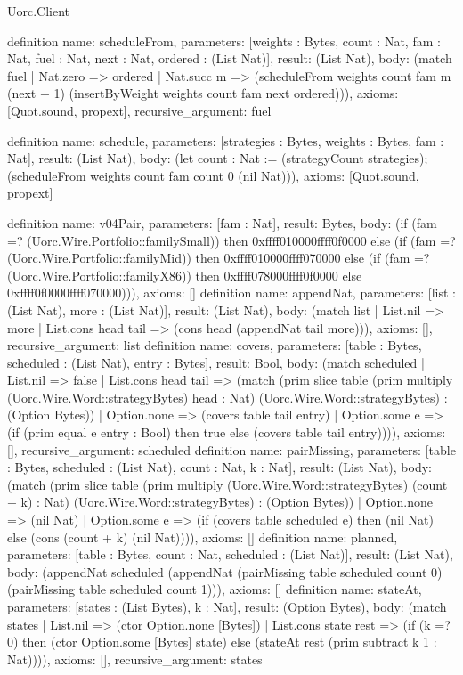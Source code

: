\begin{lexlean}{Uorc.Client}
\begin{semanticmodule}
definition{
  name: scheduleFrom,
  parameters: [weights : Bytes, count : Nat, fam : Nat, fuel : Nat, next : Nat, ordered : (List Nat)],
  result: (List Nat),
  body: (match fuel
    | Nat.zero => ordered
    | Nat.succ m => (scheduleFrom weights count fam m (next + 1) (insertByWeight weights count fam next ordered))),
  axioms: [Quot.sound, propext],
  recursive_argument: fuel
}

definition{
  name: schedule,
  parameters: [strategies : Bytes, weights : Bytes, fam : Nat],
  result: (List Nat),
  body: (let count : Nat := (strategyCount strategies); (scheduleFrom weights count fam count 0 (nil Nat))),
  axioms: [Quot.sound, propext]
}

definition{
  name: v04Pair,
  parameters: [fam : Nat],
  result: Bytes,
  body: (if (fam =? (Uorc.Wire.Portfolio::familySmall)) then 0xffff010000ffff0f0000 else (if (fam =? (Uorc.Wire.Portfolio::familyMid)) then 0xffff010000ffff070000 else (if (fam =? (Uorc.Wire.Portfolio::familyX86)) then 0xffff078000ffff0f0000 else 0xffff0f0000ffff070000))),
  axioms: []
}
definition{
  name: appendNat,
  parameters: [list : (List Nat), more : (List Nat)],
  result: (List Nat),
  body: (match list
    | List.nil => more
    | List.cons head tail => (cons head (appendNat tail more))),
  axioms: [],
  recursive_argument: list
}
definition{
  name: covers,
  parameters: [table : Bytes, scheduled : (List Nat), entry : Bytes],
  result: Bool,
  body: (match scheduled
    | List.nil => false
    | List.cons head tail => (match (prim slice table (prim multiply (Uorc.Wire.Word::strategyBytes) head : Nat) (Uorc.Wire.Word::strategyBytes) : (Option Bytes))
      | Option.none => (covers table tail entry)
      | Option.some e => (if (prim equal e entry : Bool) then true else (covers table tail entry)))),
  axioms: [],
  recursive_argument: scheduled
}
definition{
  name: pairMissing,
  parameters: [table : Bytes, scheduled : (List Nat), count : Nat, k : Nat],
  result: (List Nat),
  body: (match (prim slice table (prim multiply (Uorc.Wire.Word::strategyBytes) (count + k) : Nat) (Uorc.Wire.Word::strategyBytes) : (Option Bytes))
    | Option.none => (nil Nat)
    | Option.some e => (if (covers table scheduled e) then (nil Nat) else (cons (count + k) (nil Nat)))),
  axioms: []
}
definition{
  name: planned,
  parameters: [table : Bytes, count : Nat, scheduled : (List Nat)],
  result: (List Nat),
  body: (appendNat scheduled (appendNat (pairMissing table scheduled count 0) (pairMissing table scheduled count 1))),
  axioms: []
}
definition{
  name: stateAt,
  parameters: [states : (List Bytes), k : Nat],
  result: (Option Bytes),
  body: (match states
    | List.nil => (ctor Option.none [Bytes])
    | List.cons state rest => (if (k =? 0) then (ctor Option.some [Bytes] state) else (stateAt rest (prim subtract k 1 : Nat)))),
  axioms: [],
  recursive_argument: states
}


\end{semanticmodule}
\end{lexlean}
